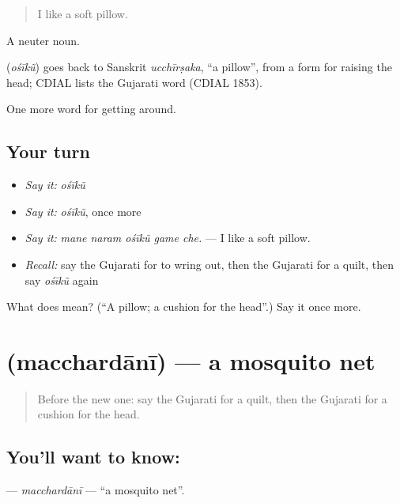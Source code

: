 \begin{quote}
I like a soft pillow.
\end{quote}

A neuter noun.

\begin{cousinweb}
\textbf{} (\emph{ośīkũ}) goes back to Sanskrit \emph{ucchīrṣaka}, \textquotedblleft{}a pillow\textquotedblright{}, from a form for raising the head; CDIAL lists the Gujarati word (CDIAL 1853).
\end{cousinweb}

\begin{grammarlens}[title={What you've built}]
One more word for getting around.
\end{grammarlens}

\subsection*{Your turn}
\begin{itemize}
\raggedright
  \item \emph{Say it:} \emph{ośīkũ}
  \item \emph{Say it:} \emph{ośīkũ}, once more
  \item \emph{Say it:} \emph{mane naram ośīkũ game che.} — I like a soft pillow.
  \item \emph{Recall:} say the Gujarati for to wring out, then the Gujarati for a quilt, then say \emph{ośīkũ} again
\end{itemize}

\begin{tcolorbox}[breakable,colback=teal!4,colframe=teal!35!black,title={Before you move on}]
What does  mean? (\textquotedblleft{}A pillow; a cushion for the head\textquotedblright{}.) Say it once more.
\end{tcolorbox}
\section[\texorpdfstring{\gu{મચ્છરદાની} (macchardānī)}{મચ્છરદાની (macchardānī)}]{ (macchardānī) — a mosquito net}

\label{lesson:GU-C411-macchardani}



\begin{quote}
Before the new one: say the Gujarati for a quilt, then the Gujarati for a cushion for the head.
\end{quote}

\subsection*{You'll want to know: }
\textbf{} — \emph{macchardānī} — \textquotedblleft{}a mosquito net\textquotedblright{}.

